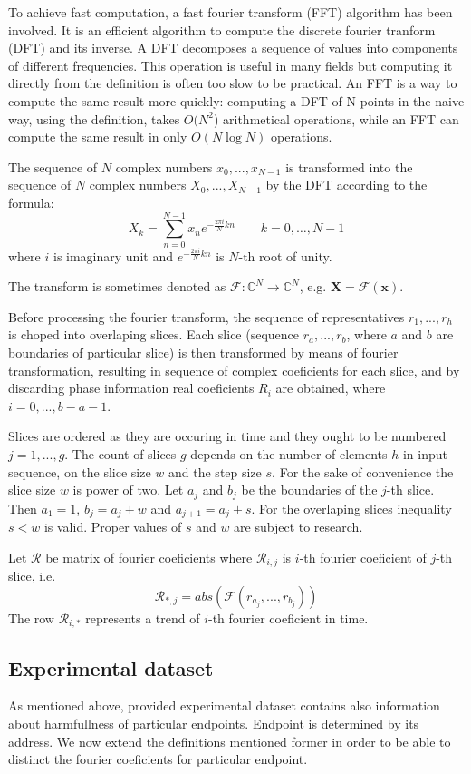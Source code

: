 \documentclass[a4paper]{IEEEtran}
\begin{document}
To achieve fast computation, a fast fourier transform (FFT) algorithm 
has been involved.
It is an efficient algorithm to compute the discrete fourier tranform (DFT) and
its inverse.
A DFT decomposes a sequence of values into components of
different frequencies. 
This operation is useful in many fields but computing it directly from the
definition is often too slow to be practical.
An FFT is a way to compute the same result more quickly: 
computing a DFT of N points in the naive way, using the definition, takes
$O(N^2$) arithmetical operations, 
while an FFT can compute the same result in only $ O(N \log N)$ operations.

The sequence of $N$ complex numbers $x_0, ..., x_{N−1}$ is transformed into the
sequence of $N$ complex numbers $X_0, ..., X_{N−1}$ by the DFT according to the
formula:
\[
X_k = \sum_{n=0}^{N-1} x_n e^{-\frac{2 \pi i}{N} k n} \quad \quad k = 0, \dots, N-1
\]
where $i$ is imaginary unit and $e^{-\frac{2 \pi i}{N} k n}$ is $N$-th root of
unity. 

The transform is sometimes denoted as 
$\mathcal{F}\colon\mathbb{C}^N \to \mathbb{C}^N$, e.g.
$\mathbf{X} = \mathcal{F} \left ( \mathbf{x} \right )$.

Before processing the fourier transform, the sequence of representatives 
$r_1, ...,r_h$ is choped into overlaping slices.
Each slice (sequence $r_a, ..., r_b$, where $a$ and $b$ are boundaries
of particular slice) is then transformed by means of fourier transformation,
resulting in sequence of complex coeficients for each slice,
and by discarding phase information real coeficients ${R}_i$ are obtained,
where $i = 0, ..., b-a-1$.

Slices are ordered as they are occuring in time and they ought to be numbered
$j = 1,..., g $. The count of slices $g$ depends on the number of elements $h$
in input sequence, on the slice size $w$ and the step size $s$.
For the sake of convenience the slice size $w$ is power of two.
Let $a_j$ and $b_j$ be the boundaries of the $j$-th slice. Then
$a_1 = 1$, $b_j = a_j + w$ and $a_{j+1} = a_j + s$.
For the overlaping slices inequality $s < w$ is valid.
Proper values of $s$ and $w$ are subject to research.

Let $\mathcal{R}$ be matrix of fourier coeficients where
$\mathcal{R}_{i,j}$ is $i$-th fourier coeficient of $j$-th slice,
i.e. 
\[
\mathcal{R}_{*,j} = abs(\mathcal{F}(r_{a_j}, ..., r_{b_j}))
\]
The row $\mathcal{R}_{i,*}$ represents a trend of $i$-th fourier
coeficient in time.

\subsection{Experimental dataset}
As mentioned above, provided experimental dataset contains also 
information about harmfullness of particular endpoints. Endpoint is
determined by its address. We now extend the definitions mentioned
former in order to be able to distinct the fourier coeficients for
particular endpoint.
\end{document}
